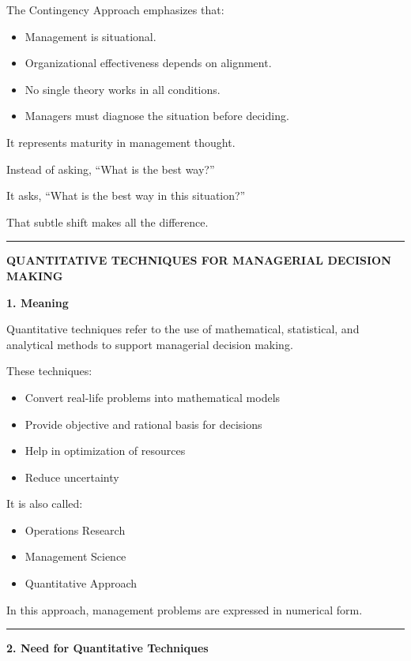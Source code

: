 \documentclass[10pt,a4paper]{article}
\newcommand{\separator}{\vspace{0.4em}\noindent\rule{\linewidth}{0.6pt}\vspace{0.4em}}
\begin{document}
The Contingency Approach emphasizes that:

\begin{itemize}
  \item Management is situational.
  \item Organizational effectiveness depends on alignment.
  \item No single theory works in all conditions.
  \item Managers must diagnose the situation before deciding.
\end{itemize}

It represents maturity in management thought.

Instead of asking, ``What is the best way?''

It asks, ``What is the best way in this situation?''

That subtle shift makes all the difference.

\separator

\begin{center}
  \large\textbf{QUANTITATIVE TECHNIQUES FOR MANAGERIAL DECISION MAKING}
\end{center}

\textbf{1. Meaning}

Quantitative techniques refer to the use of mathematical, statistical, and analytical methods
to support managerial decision making.

These techniques:
\begin{itemize}
  \item Convert real-life problems into mathematical models
  \item Provide objective and rational basis for decisions
  \item Help in optimization of resources
  \item Reduce uncertainty
\end{itemize}

It is also called:
\begin{itemize}
  \item Operations Research
  \item Management Science
  \item Quantitative Approach
\end{itemize}

In this approach, management problems are expressed in numerical form.

\separator

\textbf{2. Need for Quantitative Techniques}
\end{document}
